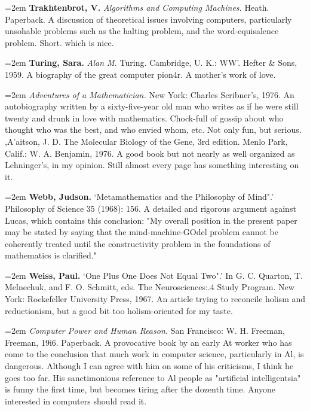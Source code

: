 \par\noindent\hangindent=2em {\bf Trakhtenbrot, V.} {\it Algorithms and Computing Machines.} Heath. Paperback. A discussion of theoretical issues involving computers, particularly unsohable problems such as the halting problem, and the word-equisalence problem. Short. which is nice.

\par\noindent\hangindent=2em {\bf Turing, Sara.} {\it Alan M.} Turing. Cambridge, U. K.: WW'. Hefter \& Sons, 1959. A biography of the great computer pion4r. A mother's work of love.

\par\noindent\hangindent=2em  {\it Adventures of a Mathematician.} New York: Charles Scribner's, 1976. An autobiography written by a sixty-five-year old man who writes as if he were still twenty and drunk in love with mathematics. Chock-full of gossip about who thought who was the best, and who envied whom, etc. Not only fun, but serious. ,A'aitson, J. D. The Molecular Biology of the Gene, 3rd edition. Menlo Park, Calif.: W. A. Benjamin, 1976. A good book but not nearly as well organized as Lehninger's, in my opinion. Still almost every page has something interesting on it.

\par\noindent\hangindent=2em {\bf Webb, Judson.} `Metamathematics and the Philosophy of Mind".' Philosophy of Science 35 (1968): 156. A detailed and rigorous argument against Lucas, which contains this conclusion: "My overall position in the present paper may be stated by saying that the mind-machine-GOdel problem cannot be coherently treated until the constructivity problem in the foundations of mathematics is clarified."

\par\noindent\hangindent=2em {\bf Weiss, Paul.} `One Plus One Does Not Equal Two".' In G. C. Quarton, T. Melnechuk, and F. O. Schmitt, eds. The Neurosciences:.4 Study Program. New York: Rockefeller University Press, 1967. An article trying to reconcile holism and reductionism, but a good bit too holism-oriented for my taste.

\par\noindent\hangindent=2em  {\it Computer Power and Human Reason.} San Francisco: W. H. Freeman, Freeman, 19i6. Paperback. A provocative book by an early At worker who has come to the conclusion that much work in computer science, particularly in Al, is dangerous. Although I can agree with him on some of his criticisms, I think he goes too far. His sanctimonious reference to Al people as "artificial intelligentsia" is funny the first time, but becomes tiring after the dozenth time. Anyone interested in computers should read it.

